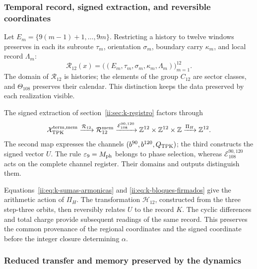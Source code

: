 \subsubsection{Temporal record, signed extraction, and reversible coordinates}

Let \(E_m=\{9(m-1)+1,\ldots,9m\}\). Restricting a history
to twelve windows preserves in each its subroute \(\tau_m\),
orientation \(\sigma_m\), boundary carry \(\kappa_m\), and local
record \(\Lambda_m\):
\[
 \mathcal R_{12}(x)
 =\bigl((E_m,\tau_m,\sigma_m,\kappa_m,\Lambda_m)\bigr)_{m=1}^{12}.
\]
The domain of \(\mathcal R_{12}\) is histories; the elements of
the group \(C_{12}\) are sector classes, and
\(\Theta_{108}\) preserves their calendar. This distinction keeps
the data preserved by each realization visible.

The signed extraction of section~\ref{ii:sec:k-registro} factors through
\begin{equation}
 \mathcal X_{\rm TPK}^{\rm term,mem}
 \xrightarrow{\mathcal R_{12}}\mathcal R_{12}^{\rm mem}
 \xrightarrow{\mathcal E_{108}^{90,120}}
 \mathbb Z^{12}\times\mathbb Z^{12}\times\mathbb Z
 \xrightarrow{\Pi_H}\mathbb Z^{12}.
 \label{ii:ii:tpk-extraccion-tipada}
\end{equation}
The second map expresses the channels \((b^{90},b^{120},Q_{\rm TPK})\); the third constructs the signed vector \(U\). The rule \(\varepsilon_9=M_{\rm ph}\) belongs to phase selection, whereas \(\mathcal E_{108}^{90,120}\) acts on the complete channel register. Their domains and outputs distinguish them.

Equations~\eqref{ii:eq:k-sumas-armonicas} and
\eqref{ii:eq:k-bloques-firmados} give the arithmetic action of \(\Pi_H\).
The transformation \(\mathcal H_{12}\), constructed from the
three step-three orbits, then reversibly relates \(U\) to the
record \(K\). The cyclic differences and total charge provide
subsequent readings of the same record. This preserves the common
provenance of the regional coordinates and the signed coordinate before the
integer closure determining \(\alpha\).

\subsubsection{Reduced transfer and memory preserved by the dynamics}

